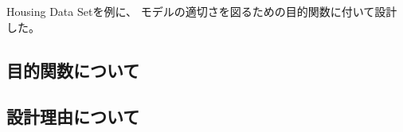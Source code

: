 Housing Data Set\cite{housingdata}を例に、
モデルの適切さを図るための目的関数に付いて設計した。

\subsection{目的関数について}
\subsection{設計理由について}

